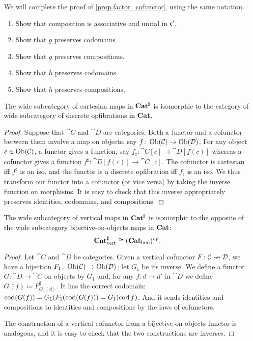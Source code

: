 \documentclass[Book-Poly]{subfiles}
\begin{document}
\begin{exercise}\label{exc.factor_cofunctor}
We will complete the proof of \cref{prop.factor_cofunctor}, using the same notation.
\begin{enumerate}
	\item Show that composition is associative and unital in $\mathfrak{c}'$.
	\item Show that $g$ preserves codomains.
	\item Show that $g$ preserves compositions.
	\item Show that $h$ preserves codomains.
	\item Show that $h$ preserves compositions.
\qedhere
\end{enumerate}
\end{exercise}


\begin{proposition}
The wide subcategory of cartesian maps in $\mathbf{Cat}^\sharp$ is isomorphic to the category of wide subcategory of discrete opfibrations in $\mathbf{Cat}$.
\end{proposition}
\begin{proof}
Suppose that $\cat{C}$ and $\cat{D}$ are categories. Both a functor and a cofunctor between them involve a map on objects, say $f\colon\operatorname{Ob}(\mathcal{C})\to\operatorname{Ob}(\mathcal{D})$. For any object $c\in\operatorname{Ob}(\mathcal{C})$, a functor gives a function, say $f_\sharp\colon\cat{C}[c]\to\cat{D}[f(c)]$ whereas a cofunctor gives a function $f^\sharp\colon\cat{D}[f(c)]\to\cat{C}[c]$. The cofunctor is cartesian iff $f^\sharp$ is an iso, and the functor is a discrete opfibration iff $f_\sharp$ is an iso. We thus transform our functor into a cofunctor (or vice versa) by taking the inverse function on morphisms. It is easy to check that this inverse appropriately preserves identities, codomains, and compositions.
\end{proof}

\begin{proposition}\label{prop.com_vert_cat_boo}
The wide subcategory of vertical maps in $\mathbf{Cat}^\sharp$ is isomorphic to the opposite of the wide subcategory bijective-on-objects maps in $\mathbf{Cat}$:
\[
\mathbf{Cat}^\sharp_{\text{vert}}\cong(\mathbf{Cat}_{\text{boo}})^{\textnormal{op}}.
\]
\end{proposition}
\begin{proof}
Let $\cat{C}$ and $\cat{D}$ be categories. Given a vertical cofunctor $F\colon\mathcal{C}\nrightarrow\mathcal{D}$, we have a bijection $F_1\colon\operatorname{Ob}(\mathcal{C})\to\operatorname{Ob}(\mathcal{D})$; let $G_1$ be its inverse. We define a functor $G\colon\cat{D}\to\cat{C}$ on objects by $G_1$ and, for any $f\colon d\to d'$ in $\cat{D}$ we define $G(f)\coloneqq F^\sharp_{G_1(d)}$. It has the correct codomain: $\operatorname{cod}(G(f))=G_1(F_1(\operatorname{cod}(G(f)))=G_1(\operatorname{cod} f)$. And it sends identities and compositions to identities and compositions by the laws of cofunctors.

The construction of a vertical cofunctor from a bijective-on-objects functor is analogous, and it is easy to check that the two constructions are inverses.
\end{proof}
\end{document}
